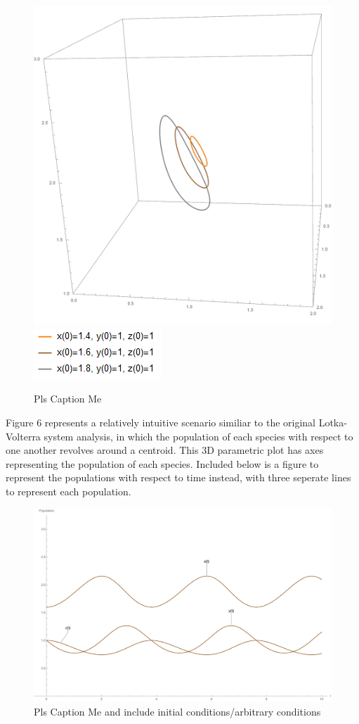 \documentclass[11pt,oneside]{article}
\begin{document}
	\begin{figure}[H]
		\center
		\includegraphics[scale=0.40]{3Parametric}
		\includegraphics[scale=0.75]{Legend}
		\caption{Pls Caption Me}
	\end{figure}
	
	Figure 6 represents a relatively intuitive scenario similiar to the original Lotka-Volterra system analysis, in which the population of each species with respect to one another revolves around a centroid. This 3D parametric plot has axes representing the population of each species. Included below is a figure to represent the populations with respect to time instead, with three seperate lines to represent each population.
	
	\begin{figure}[H]
		\center
		\includegraphics[scale=0.5]{par2}
		\caption{Pls Caption Me and include initial conditions/arbitrary conditions}
	\end{figure}
	
\end{document}
